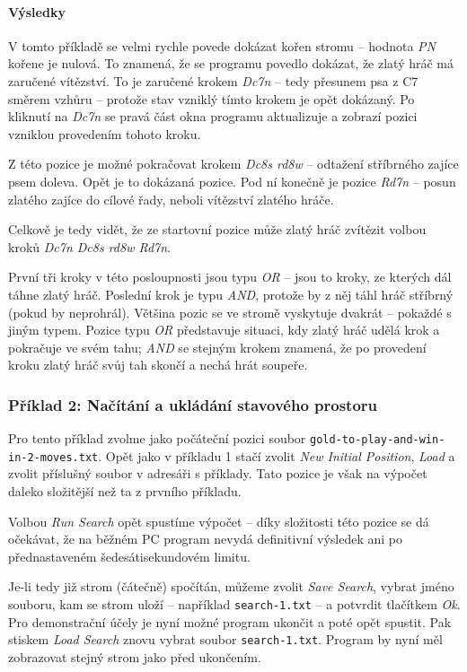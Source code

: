 \documentclass{article}
\begin{document}
\paragraph{Výsledky}
V tomto příkladě se velmi rychle povede dokázat kořen stromu -- hodnota \emph{PN} kořene je nulová. To znamená, že se
programu povedlo dokázat, že zlatý hráč má zaručené vítězství. To je zaručené krokem \emph{Dc7n} -- tedy přesunem psa z
C7 směrem vzhůru -- protože stav vzniklý tímto krokem je opět dokázaný. Po kliknutí na \emph{Dc7n} se pravá část okna
programu aktualizuje a zobrazí pozici vzniklou provedením tohoto kroku.

Z této pozice je možné pokračovat krokem \emph{Dc8s rd8w} -- odtažení stříbrného zajíce psem doleva. Opět je to dokázaná
pozice. Pod ní konečně je pozice \emph{Rd7n} -- posun zlatého zajíce do cílové řady, neboli vítězství zlatého hráče.

Celkově je tedy vidět, že ze startovní pozice může zlatý hráč zvítězit volbou kroků \emph{Dc7n Dc8s rd8w Rd7n}.

První tři kroky v této posloupnosti jsou typu \emph{OR} -- jsou to kroky, ze kterých dál táhne zlatý hráč. Poslední krok
je typu \emph{AND}, protože by z něj táhl hráč stříbrný (pokud by neprohrál). Většina pozic se ve stromě vyskytuje
dvakrát -- pokaždé s jiným typem. Pozice typu \emph{OR} představuje situaci, kdy zlatý hráč udělá krok a pokračuje ve
svém tahu; \emph{AND} se stejným krokem znamená, že po provedení kroku zlatý hráč svůj tah skončí a nechá hrát soupeře.

\subsubsection{Příklad 2: Načítání a ukládání stavového prostoru}
\label{sec:gui-example-2}
Pro tento příklad zvolme jako počáteční pozici soubor \texttt{gold-to-play-and-win-in-2-moves.txt}. Opět jako v příkladu
1 stačí zvolit \emph{New Initial Position}, \emph{Load} a zvolit příslušný soubor v adresáři s příklady. Tato pozice je
však na výpočet daleko složitější než ta z prvního příkladu.

Volbou \emph{Run Search} opět spustíme výpočet -- díky složitosti této pozice se dá očekávat, že na běžném PC program
nevydá definitivní výsledek ani po přednastaveném šedesátisekundovém limitu.

Je-li tedy již strom (čátečně) spočítán, můžeme zvolit \emph{Save Search}, vybrat jméno souboru, kam se strom uloží --
například \texttt{search-1.txt} -- a potvrdit tlačítkem \emph{Ok}. Pro demonstrační účely je nyní možné program ukončit
a poté opět spustit. Pak stiskem \emph{Load Search} znovu vybrat soubor \texttt{search-1.txt}. Program by nyní měl
zobrazovat stejný strom jako před ukončením.
\end{document}

